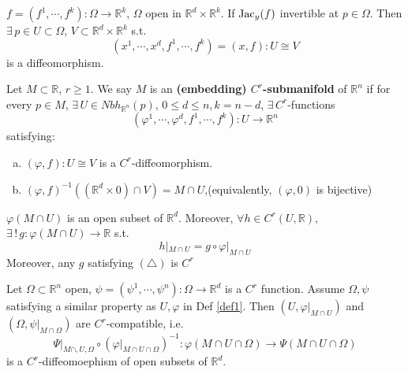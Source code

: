 \begin{corollary}
     $ f=(f^1,\cdots,f^k):\Omega\rightarrow\mathbb{R}^k $, $ \Omega  $ open in  $ \mathbb{R}^d \times \mathbb{R}^k$. If  $ \operatorname{Jac}_y(f) $ invertible at  $ p\in \Omega $. Then  $ \exists\, p\in U\subset \Omega$,  $ V\subset\mathbb{R}^d\times \mathbb{R}^k $ s.t.
     \[(x^1,\cdots,x^d,f^1,\cdots,f^k)=(x,f):U\cong V\]
     is a diffeomorphism.   
\end{corollary}
\begin{definition}\label{def1}
    Let  $ M\subset \mathbb{R} $,  $ r \geq 1 $. We say  $ M  $ is an \textbf{(embedding) $ C^r $-submanifold} of  $ \mathbb{R}^n $  if for every  $ p\in M $,  $ \exists\,U\in Nbh_{\mathbb{R}^n}(p) $,  $ 0 \leq d \leq n,k=n-d $,  $ \exists\,C^r  $-functions
    \[( \varphi^1,\cdots,\varphi^d,f^1,\cdots,f^k):U\rightarrow \mathbb{R}^n\]
    satisfying:
    \begin{enumerate}[(a)]
        \item  $ (\varphi,f):U\cong V $ is a  $ C^r $-diffeomorphism.
        \item    $ (\varphi,f)^{-1}((\mathbb{R}^d\times 0)\cap V)=M\cap U $,(equivalently, $ (\varphi,0) $ is bijective) 
    \end{enumerate}    
\end{definition}
\begin{proposition}
     $ \varphi(M\cap U) $ is an open subset of  $ \mathbb{R}^d $. Moreover,  $ \forall h\in C^r(U,\mathbb{R}) $,  $ \exists\,!\, g:\varphi(M\cap U)\rightarrow\mathbb{R} $ s.t. 
     \begin{equation}
        h|_{M\cap U}=g\circ \varphi|_{M\cap U}\tag{$ \triangle $}
     \end{equation} 
     Moreover, any  $ g $ satisfying  $ (\triangle) $  is  $ C^r $ 
\end{proposition}
\begin{lemma}
    Let  $ \Omega\subset \mathbb{R}^n $ open,  $ \psi=(\psi^1,\cdots,\psi^n):\Omega\rightarrow \mathbb{R}^d $ is a $ C^r $ function.  Assume  $ \Omega,\psi $ satisfying a similar property as  $ U,\varphi $ in  Def \ref{def1}. Then  $ (U,\varphi|_{M\cap U}) $ and  $ (\Omega,\psi|_{M\cap \Omega}) $ are  $ C^r $-compatible, i.e.
    \[\Psi|_{M\cap,U,\Omega}\circ (\varphi|_{M\cap U\cap \Omega})^{-1}:\varphi(M\cap U\cap \Omega)\rightarrow \Psi(M\cap U\cap \Omega)\]   
    is a  $ C^r $-diffeomoephism of open subsets of  $ \mathbb{R}^d $.  
\end{lemma}

